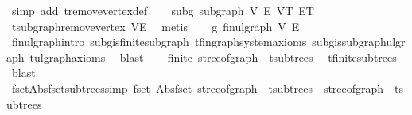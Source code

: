 \begin{isabellebody}
\ {\isacharparenleft}{\kern0pt}simp\ add{\isacharcolon}{\kern0pt}\ t{\isachardot}{\kern0pt}remove{\isacharunderscore}{\kern0pt}vertex{\isacharunderscore}{\kern0pt}def{\isacharparenright}{\kern0pt}\isanewline
\ \ \isamarkupfalse%
\ subg{\isacharcolon}{\kern0pt}\ subgraph\ V{\isacharprime}{\kern0pt}\ E{\isacharprime}{\kern0pt}\ V\isactrlsub T\ E\isactrlsub T\ \isamarkupfalse%
\ t{\isachardot}{\kern0pt}subgraph{\isacharunderscore}{\kern0pt}remove{\isacharunderscore}{\kern0pt}vertex\ VE{\isacharprime}{\kern0pt}\ \isamarkupfalse%
\ metis\isanewline
\ \ \isamarkupfalse%
\ g{\isacharprime}{\kern0pt}{\isacharcolon}{\kern0pt}\ fin{\isacharunderscore}{\kern0pt}ulgraph\ V{\isacharprime}{\kern0pt}\ E{\isacharprime}{\kern0pt}\ \isamarkupfalse%
\ fin{\isacharunderscore}{\kern0pt}ulgraph{\isachardot}{\kern0pt}intro\ subg{\isachardot}{\kern0pt}is{\isacharunderscore}{\kern0pt}finite{\isacharunderscore}{\kern0pt}subgraph\ t{\isachardot}{\kern0pt}fin{\isacharunderscore}{\kern0pt}graph{\isacharunderscore}{\kern0pt}system{\isacharunderscore}{\kern0pt}axioms\ subg{\isachardot}{\kern0pt}is{\isacharunderscore}{\kern0pt}subgraph{\isacharunderscore}{\kern0pt}ulgraph\ t{\isachardot}{\kern0pt}ulgraph{\isacharunderscore}{\kern0pt}axioms\ \isamarkupfalse%
\ blast\isanewline
\isanewline
\ \ \isamarkupfalse%
\ {\isachardoublequoteopen}finite\ {\isacharparenleft}{\kern0pt}stree{\isacharunderscore}{\kern0pt}of{\isacharunderscore}{\kern0pt}graph\ {\isacharbackquote}{\kern0pt}\ t{\isachardot}{\kern0pt}subtrees{\isacharparenright}{\kern0pt}{\isachardoublequoteclose}\ \isamarkupfalse%
\ t{\isachardot}{\kern0pt}finite{\isacharunderscore}{\kern0pt}subtrees\ \isamarkupfalse%
\ blast\isanewline
\ \ \isamarkupfalse%
\ \isamarkupfalse%
\ fset{\isacharunderscore}{\kern0pt}Abs{\isacharunderscore}{\kern0pt}fset{\isacharunderscore}{\kern0pt}subtrees{\isacharbrackleft}{\kern0pt}simp{\isacharbrackright}{\kern0pt}{\isacharcolon}{\kern0pt}\ {\isachardoublequoteopen}fset\ {\isacharparenleft}{\kern0pt}Abs{\isacharunderscore}{\kern0pt}fset\ {\isacharparenleft}{\kern0pt}stree{\isacharunderscore}{\kern0pt}of{\isacharunderscore}{\kern0pt}graph\ {\isacharbackquote}{\kern0pt}\ t{\isachardot}{\kern0pt}subtrees{\isacharparenright}{\kern0pt}{\isacharparenright}{\kern0pt}\ {\isacharequal}{\kern0pt}\ stree{\isacharunderscore}{\kern0pt}of{\isacharunderscore}{\kern0pt}graph\ {\isacharbackquote}{\kern0pt}\ t{\isachardot}{\kern0pt}subtrees{\isachardoublequoteclose}\ \isamarkupfalse%

\end{isabellebody}
